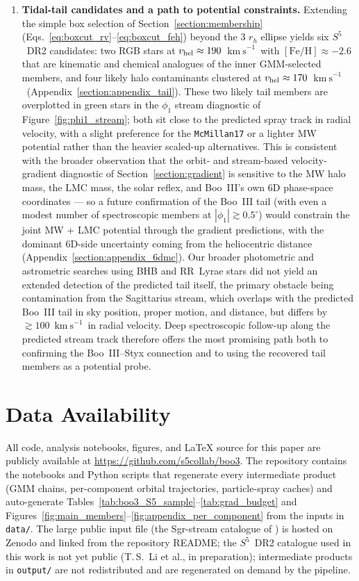 \documentclass[twocolumn]{aastex631}
\newcommand{\SSSSS}{${S}^5$\xspace}
\newcommand{\vlosUnits}{$\mathrm{km~s}^{-1}$\xspace}
\begin{document}
\begin{enumerate}[leftmargin=*]
\item \textbf{Tidal-tail candidates and a path to potential constraints.} Extending the simple box selection of Section~\ref{section:membership} (Eqs.~\ref{eq:boxcut_rv}--\ref{eq:boxcut_feh}) beyond the 3 $r_h$ ellipse yields six \SSSSS\ DR2 candidates: two RGB stars at $v_{\rm hel} \approx 190$~\vlosUnits\ with $[\mathrm{Fe/H}] \approx -2.6$ that are kinematic and chemical analogues of the inner GMM-selected members, and four likely halo contaminants clustered at $v_{\rm hel} \approx 170$~\vlosUnits\ (Appendix~\ref{section:appendix_tail}). These two likely tail members are overplotted in green stars in the $\phi_1$ stream diagnostic of Figure~\ref{fig:phi1_stream}; both sit close to the predicted spray track in radial velocity, with a slight preference for the \texttt{McMillan17} or a lighter MW potential rather than the heavier scaled-up alternatives. This is consistent with the broader observation that the orbit- and stream-based velocity-gradient diagnostic of Section~\ref{section:gradient} is sensitive to the MW halo mass, the LMC mass, the solar reflex, and Boo~III's own 6D phase-space coordinates --- so a future confirmation of the Boo~III tail (with even a modest number of spectroscopic members at $|\phi_1| \gtrsim 0.5^\circ$) would constrain the joint MW + LMC potential through the gradient predictions, with the dominant 6D-side uncertainty coming from the heliocentric distance (Appendix~\ref{section:appendix_6dmc}). Our broader photometric and astrometric searches using BHB and RR~Lyrae stars did not yield an extended detection of the predicted tail itself, the primary obstacle being contamination from the Sagittarius stream, which overlaps with the predicted Boo~III tail in sky position, proper motion, and distance, but differs by $\gtrsim 100$~\vlosUnits\ in radial velocity. Deep spectroscopic follow-up along the predicted stream track therefore offers the most promising path both to confirming the Boo~III--Styx connection and to using the recovered tail members as a potential probe.

\end{enumerate}

\section{Data Availability} \label{section:data_availability}
All code, analysis notebooks, figures, and LaTeX source for this paper are publicly available at \url{https://github.com/s5collab/boo3}.  The repository contains the notebooks and Python scripts that regenerate every intermediate product (GMM chains, per-component orbital trajectories, particle-spray caches) and auto-generate Tables~\ref{tab:boo3_S5_sample}--\ref{tab:grad_budget} and Figures~\ref{fig:main_members}--\ref{fig:appendix_per_component} from the inputs in \texttt{data/}.  The large public input file (the Sgr-stream catalogue of \citealt{Vasiliev2021}) is hosted on Zenodo and linked from the repository README; the \SSSSS\ DR2 catalogue used in this work is not yet public (T.\,S.~Li et al., in preparation); intermediate products in \texttt{output/} are not redistributed and are regenerated on demand by the pipeline.
\end{document}
